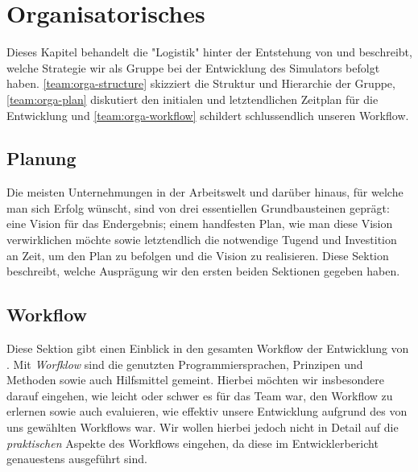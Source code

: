 
\section{Organisatorisches}
\label{team:orga}

Dieses Kapitel behandelt die "Logistik" hinter der Entstehung von \erasim{} und
beschreibt, welche Strategie wir als Gruppe bei der Entwicklung des Simulators
befolgt haben. \autoref{team:orga-structure} skizziert die Struktur und
Hierarchie der Gruppe, \autoref{team:orga-plan} diskutiert den initialen und
letztendlichen Zeitplan für die Entwicklung und
\autoref{team:orga-workflow} schildert schlussendlich unseren Workflow.



\subsection{Planung}
\label{team:orga-plan}

Die meisten Unternehmungen in der Arbeitswelt und darüber hinaus, für welche man
sich Erfolg wünscht, sind von drei essentiellen Grundbausteinen geprägt: eine
Vision für das Endergebnis; einem handfesten Plan, wie man diese Vision
verwirklichen möchte sowie letztendlich die notwendige Tugend und Investition an
Zeit, um den Plan zu befolgen und die Vision zu realisieren. Diese Sektion
beschreibt, welche Ausprägung wir den ersten beiden Sektionen gegeben haben.





\subsection{Workflow}
\label{team:orga-workflow}
\vspace{-0.3cm}

Diese Sektion gibt einen Einblick in den gesamten Workflow der Entwicklung von
\erasim{}. Mit \emph{Worfklow} sind die genutzten Programmiersprachen, Prinzipen
und Methoden sowie auch Hilfsmittel gemeint. Hierbei möchten wir insbesondere
darauf eingehen, wie leicht oder schwer es für das Team war, den Workflow zu
erlernen sowie auch evaluieren, wie effektiv unsere Entwicklung aufgrund des von
uns gewählten Workflows war. Wir wollen hierbei jedoch nicht in Detail auf die
\emph{praktischen} Aspekte des Workflows eingehen, da diese im Entwicklerbericht
genauestens ausgeführt sind.





